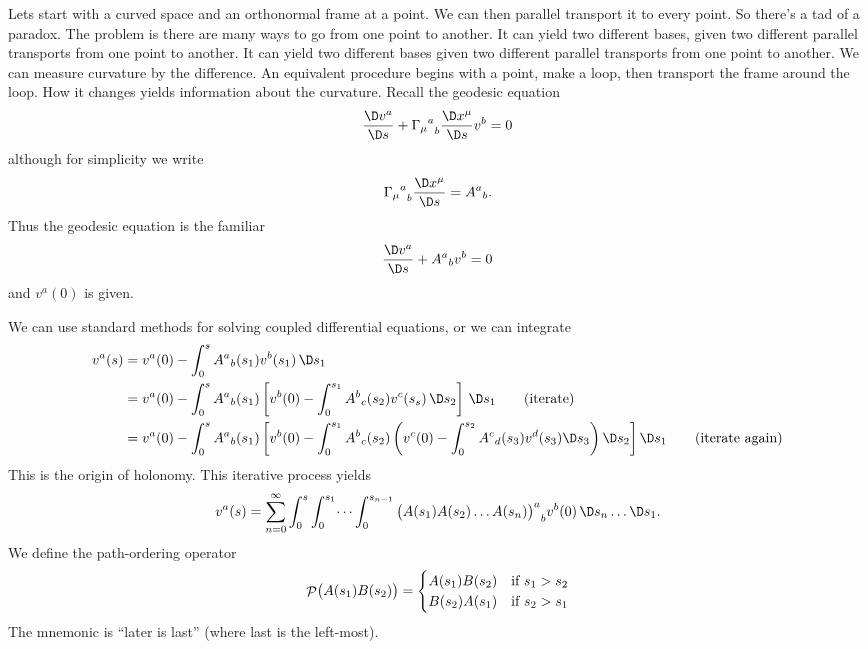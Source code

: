 Lets start with a curved space and an orthonormal frame at a
point. We can then parallel transport it to every point. So
there's a tad of a paradox. The problem is there are many ways to
go from one point to another. It can yield two different bases,
given two different parallel transports from one point to
another. It can yield two different bases given two different
parallel transports from one point to another. We can measure
curvature by the difference. An equivalent procedure begins with
a point, make a loop, then transport the frame around the
loop. How it changes yields information about the
curvature. Recall the geodesic equation
\begin{equation}
\frac{\D v^{a}}{\D s}
+{{\Gamma_{\mu}}^{a}}_{b}\frac{\D x^{\mu}}{\D s}v^{b}=0
\end{equation}
although for simplicity we write
\begin{equation}
{{\Gamma_{\mu}}^{a}}_{b}\frac{\D x^{\mu}}{\D s}={A^{a}}_{b}.
\end{equation}
Thus the geodesic equation is the familiar
\begin{equation}
\frac{\D v^{a}}{\D s}+{A^{a}}_{b}v^{b}=0
\end{equation}
and $v^{a}(0)$ is given.

We can use standard methods for solving coupled differential
equations, or we can integrate
\begin{align}
v^{a}(s)
&= v^{a}(0)-\int^{s}_{0} {A^{a}}_{b}(s_{1})v^{b}(s_{1})\,\D s_{1}\\
&= v^{a}(0)-
\int^{s}_{0} {A^{a}}_{b}(s_{1})\left[v^{b}(0)-\int^{s_{1}}_{0}{A^{b}}_{c}(s_{2})v^{c}(s_{s})\,\D s_{2}\right]\,\D s_{1}
\nonumber\tag{\mbox{iterate}}\\
&= v^{a}(0)-
\int^{s}_{0}
    {A^{a}}_{b}(s_{1})\left[v^{b}(0)-\int^{s_{1}}_{0}{A^{b}}_{c}(s_{2})
\left(v^{c}(0)-\int^{s_{2}}_{0}{A^{c}}_{d}(s_{3})v^{d}(s_{3})\D s_{3}\right)
\D s_{2}\right]\D s_{1}
\nonumber\tag{\mbox{iterate again}}
\end{align}
This is the origin of holonomy. This
iterative process yields
\begin{equation}
v^{a}(s)=\sum_{n=0}^{\infty}\int^{s}_{0}\int^{s_{1}}_{0}\dots\int^{s_{n-1}}_{0}
{\bigl(A(s_{1})A(s_{2})\dots A(s_{n})\bigr)^{a}}_{b}v^{b}(0)
\,\D s_{n}\dots\D s_{1}.
\end{equation}
We define the path-ordering operator
\begin{equation}
\mathop{\mathcal{P}}\nolimits\bigl(A(s_{1})B(s_{2})\bigr)
=\begin{cases}A(s_{1})B(s_{2}) & \mbox{if }s_{1}>s_{2}\\
B(s_{2})A(s_{1}) &\mbox{if }s_{2}>s_{1}
\end{cases}
\end{equation}
The mnemonic is ``later is last'' (where last is the left-most).

